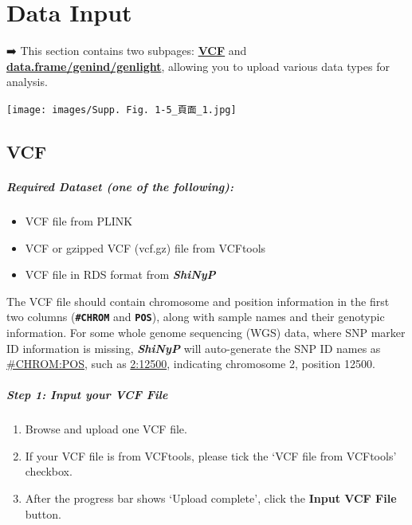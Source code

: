 \documentclass[
]{book}
\begin{document}
\chapter{Data Input}\label{sec-data-input}

➡️ This section contains two subpages: \ul{\textbf{VCF}} and \ul{\textbf{data.frame/genind/genlight}}, allowing you to upload various data types for analysis.

\texttt{[image: images/Supp. Fig. 1-5\_頁面\_1.jpg]}

\section{VCF}\label{vcf}

\paragraph*{Required Dataset (one of the following):}\label{required-dataset-one-of-the-following}

\begin{itemize}
\item
  VCF file from PLINK
\item
  VCF or gzipped VCF (vcf.gz) file from VCFtools
\item
  VCF file in RDS format from {\textbf{\emph{ShiNyP}}}
\end{itemize}

The VCF file should contain chromosome and position information in the first two columns ({\textbf{\texttt{\#CHROM}}} and {\textbf{\texttt{POS}}}), along with sample names and their genotypic information. For some whole genome sequencing (WGS) data, where SNP marker ID information is missing, {\textbf{\emph{ShiNyP}}} will auto-generate the SNP ID names as \ul{\#CHROM:POS}, such as \ul{2:12500}, indicating chromosome 2, position 12500.

\paragraph*{Step 1: Input your VCF File}\label{step-1-input-your-vcf-file}

\begin{enumerate}
\def\labelenumi{\arabic{enumi}.}
\item
  {Browse} and upload one VCF file.
\item
  If your VCF file is from VCFtools, please tick the `VCF file from VCFtools' checkbox.
\item
  After the progress bar shows `Upload complete', click the {\textbf{Input VCF File}} button.
\end{enumerate}
\end{document}
